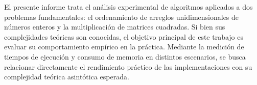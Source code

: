 El presente informe trata el análisis experimental de algoritmos aplicados a dos problemas fundamentales: el ordenamiento de arreglos unidimensionales de números enteros y la multiplicación de matrices cuadradas. Si bien sus complejidades teóricas son conocidas, el objetivo principal de este trabajo es evaluar su comportamiento empírico en la práctica. Mediante la medición de tiempos de ejecución y consumo de memoria en distintos escenarios, se busca relacionar directamente el rendimiento práctico de las implementaciones con su complejidad teórica asintótica esperada.


